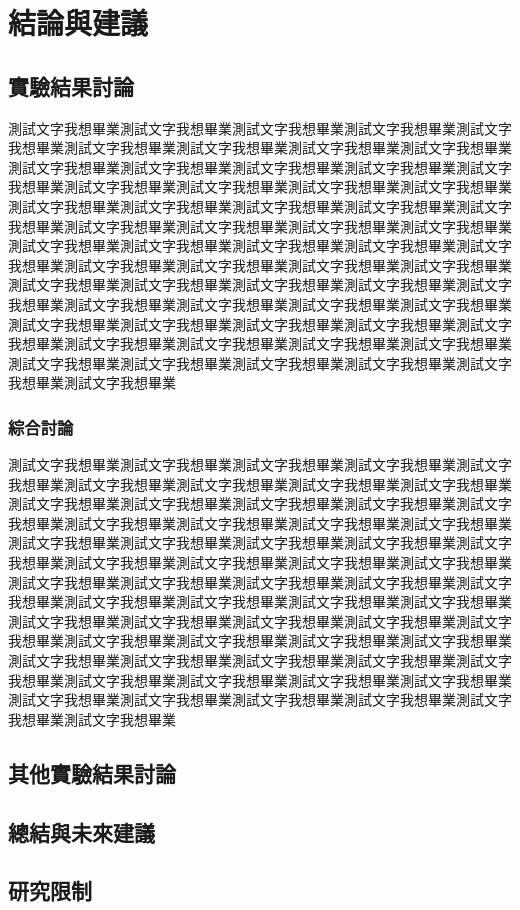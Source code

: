 \chapter{結論與建議}
\label{c:conclusion}
\section{實驗結果討論}
測試文字我想畢業測試文字我想畢業測試文字我想畢業測試文字我想畢業測試文字我想畢業測試文字我想畢業測試文字我想畢業測試文字我想畢業測試文字我想畢業測試文字我想畢業測試文字我想畢業測試文字我想畢業測試文字我想畢業測試文字我想畢業測試文字我想畢業測試文字我想畢業測試文字我想畢業測試文字我想畢業測試文字我想畢業測試文字我想畢業測試文字我想畢業測試文字我想畢業測試文字我想畢業測試文字我想畢業測試文字我想畢業測試文字我想畢業測試文字我想畢業測試文字我想畢業測試文字我想畢業測試文字我想畢業測試文字我想畢業測試文字我想畢業測試文字我想畢業測試文字我想畢業測試文字我想畢業測試文字我想畢業測試文字我想畢業測試文字我想畢業測試文字我想畢業測試文字我想畢業測試文字我想畢業測試文字我想畢業測試文字我想畢業測試文字我想畢業測試文字我想畢業測試文字我想畢業測試文字我想畢業測試文字我想畢業測試文字我想畢業測試文字我想畢業測試文字我想畢業測試文字我想畢業測試文字我想畢業測試文字我想畢業測試文字我想畢業測試文字我想畢業測試文字我想畢業測試文字我想畢業測試文字我想畢業測試文字我想畢業

\subsection{綜合討論}

測試文字我想畢業測試文字我想畢業測試文字我想畢業測試文字我想畢業測試文字我想畢業測試文字我想畢業測試文字我想畢業測試文字我想畢業測試文字我想畢業測試文字我想畢業測試文字我想畢業測試文字我想畢業測試文字我想畢業測試文字我想畢業測試文字我想畢業測試文字我想畢業測試文字我想畢業測試文字我想畢業測試文字我想畢業測試文字我想畢業測試文字我想畢業測試文字我想畢業測試文字我想畢業測試文字我想畢業測試文字我想畢業測試文字我想畢業測試文字我想畢業測試文字我想畢業測試文字我想畢業測試文字我想畢業測試文字我想畢業測試文字我想畢業測試文字我想畢業測試文字我想畢業測試文字我想畢業測試文字我想畢業測試文字我想畢業測試文字我想畢業測試文字我想畢業測試文字我想畢業測試文字我想畢業測試文字我想畢業測試文字我想畢業測試文字我想畢業測試文字我想畢業測試文字我想畢業測試文字我想畢業測試文字我想畢業測試文字我想畢業測試文字我想畢業測試文字我想畢業測試文字我想畢業測試文字我想畢業測試文字我想畢業測試文字我想畢業測試文字我想畢業測試文字我想畢業測試文字我想畢業測試文字我想畢業測試文字我想畢業



\section{其他實驗結果討論}





\section{總結與未來建議}

\section{研究限制}
